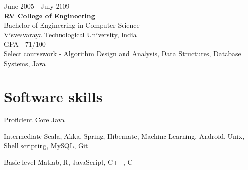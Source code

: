 \documentclass{tccv}
\begin{document}
{\hfill\sc June 2005 - July 2009}\\
\textbf{RV College of Engineering}\\
Bachelor of Engineering in Computer Science\\
Visvesvaraya Technological University, India\\
GPA - 71/100\\
Select coursework - Algorithm Design and Analysis, Data Structures, Database Systems, Java\\ 


\vspace{-0.2in}
\section{Software skills}
\begin{factlist}
\item{Proficient}
     {Core Java}       

\item{Intermediate}
     {Scala, Akka, Spring, Hibernate, Machine Learning, Android, Unix, Shell scripting, MySQL, Git}

\item{Basic level}
     {Matlab, R, JavaScript, C++, C}
\end{factlist}
\end{document}
